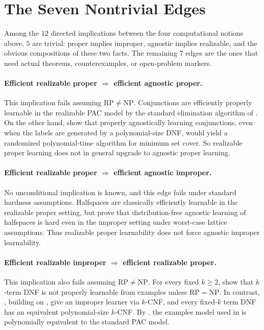 \section{The Seven Nontrivial Edges}

Among the $12$ directed implications between the four computational notions above, $5$ are trivial: proper implies improper, agnostic implies realizable, and the obvious compositions of these two facts. The remaining $7$ edges are the ones that need actual theorems, counterexamples, or open-problem markers.

\paragraph{Efficient realizable proper $\Rightarrow$ efficient agnostic proper.}
This implication fails assuming $\mathrm{RP}\neq\mathrm{NP}$. Conjunctions are efficiently properly learnable in the realizable PAC model by the standard elimination algorithm of \citet{valiant1984}. On the other hand, \citet[Theorem~2]{kearns1994} show that properly agnostically learning conjunctions, even when the labels are generated by a polynomial-size DNF, would yield a randomized polynomial-time algorithm for minimum set cover. So realizable proper learning does not in general upgrade to agnostic proper learning.

\paragraph{Efficient realizable proper $\Rightarrow$ efficient agnostic improper.}
No unconditional implication is known, and this edge fails under standard hardness assumptions. Halfspaces are classically efficiently learnable in the realizable proper setting, but \citet{tiegel2023} prove that distribution-free agnostic learning of halfspaces is hard even in the improper setting under worst-case lattice assumptions. Thus realizable proper learnability does not force agnostic improper learnability.

\paragraph{Efficient realizable improper $\Rightarrow$ efficient realizable proper.}
This implication also fails assuming $\mathrm{RP}\neq\mathrm{NP}$. For every fixed $k \ge 2$, \citet[Theorem~3.2]{pitt1988} show that $k$-term DNF is not properly learnable from examples unless $\mathrm{RP}=\mathrm{NP}$. In contrast, \citet[Theorem~3.7]{pitt1988}, building on \citet{valiant1984}, give an improper learner via $k$-CNF, and every fixed-$k$ term DNF has an equivalent polynomial-size $k$-CNF. By \citet{haussler1990}, the examples model used in \citet{pitt1988} is polynomially equivalent to the standard PAC model.

